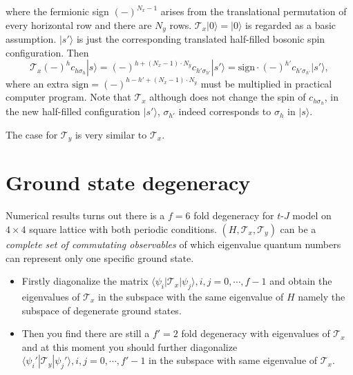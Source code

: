 \documentclass[eprint]{article} %
\begin{document}
where the fermionic sign $(-)^{N_{x}-1}$ arises from the translational permutation of every horizontal row and there are $N_{y}$ rows. $\mathcal{T}_{x}|0\rangle=|0\rangle$ is regarded as a basic assumption. $|s{'}\rangle$ is just the corresponding translated half-filled bosonic spin configuration. Then
\begin{equation}
    \mathcal{T}_{x}(-)^{h}c_{h\sigma_{h}}|s\rangle=(-)^{h+(N_{x}-1)\cdot{N}_{y}}c_{h{'}\sigma_{h{'}}}|s{'}\rangle=\text{sign}\cdot(-)^{h{'}}c_{h{'}\sigma_{h{'}}}|s{'}\rangle,
    \label{<+label+>}
\end{equation}
where an extra $\text{sign}=(-)^{h-h{'}+(N_{x}-1)\cdot{N}_{y}}$ must be multiplied in practical computer program. Note that $\mathcal{T}_{x}$ although does not change the spin of $c_{h\sigma_{h}}$, in the new half-filled configuration $|s{'}\rangle$, $\sigma_{h{'}}$ indeed corresponds to $\sigma_{h}$ in $|s\rangle$.

The case for $\mathcal{T}_{y}$ is very similar to $\mathcal{T}_{x}$.

\section{Ground state degeneracy}
Numerical results turns out there is a $f=6$ fold degeneracy for $t$-$J$ model on $4\times4$ square lattice with both periodic conditions. $(H, \mathcal{T}_{x}, \mathcal{T}_{y})$ can be a \emph{complete set of commutating observables} of which eigenvalue quantum numbers can represent only one specific ground state.
\begin{itemize}
    \item Firstly diagonalize the matrix $\langle\psi_{i}|\mathcal{T}_{x}|\psi_{j}\rangle, i, j=0, \cdots, f-1$ and obtain the eigenvalues of $\mathcal{T}_{x}$ in the subspace with the same eigenvalue of $H$ namely the subspace of degenerate ground states.
    \item Then you find there are still a $f{'}=2$ fold degeneracy with eigenvalues of $\mathcal{T}_{x}$ and at this moment you should further diagonalize $\langle\psi_{i}{'}|\mathcal{T}_{y}|\psi_{j}{'}\rangle, i, j=0, \cdots, f{'}-1$ in the subspace with same eigenvalue of $\mathcal{T}_{x}$.
\end{itemize}

 

\end{document}
